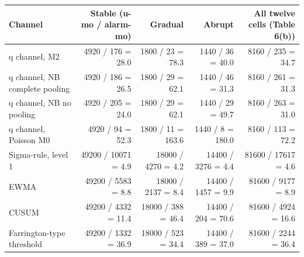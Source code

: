 \documentclass[10pt,a4paper]{article}
\begin{document}
\noindent\begin{minipage}{\linewidth}
\label{tab:S2-4}
\centering\scriptsize
\begin{tabular}{lrrrr}
\toprule
Channel & Stable (u-mo / alarm-mo) & Gradual & Abrupt & All twelve cells (Table 6(b)) \\ \midrule
q channel, M2 & 4920 / 176 = 28.0 & 1800 / 23 = 78.3 & 1440 / 36 = 40.0 & 8160 / 235 = 34.7 \\
q channel, NB complete pooling & 4920 / 186 = 26.5 & 1800 / 29 = 62.1 & 1440 / 46 = 31.3 & 8160 / 261 = 31.3 \\
q channel, NB no pooling & 4920 / 205 = 24.0 & 1800 / 29 = 62.1 & 1440 / 29 = 49.7 & 8160 / 263 = 31.0 \\
q channel, Poisson M0 & 4920 / 94 = 52.3 & 1800 / 11 = 163.6 & 1440 / 8 = 180.0 & 8160 / 113 = 72.2 \\
Sigma-rule, level 1 & 49200 / 10071 = 4.9 & 18000 / 4270 = 4.2 & 14400 / 3276 = 4.4 & 81600 / 17617 = 4.6 \\
EWMA & 49200 / 5583 = 8.8 & 18000 / 2137 = 8.4 & 14400 / 1457 = 9.9 & 81600 / 9177 = 8.9 \\
CUSUM & 49200 / 4332 = 11.4 & 18000 / 388 = 46.4 & 14400 / 204 = 70.6 & 81600 / 4924 = 16.6 \\
Farrington-type threshold & 49200 / 1332 = 36.9 & 18000 / 523 = 34.4 & 14400 / 389 = 37.0 & 81600 / 2244 = 36.4 \\
\bottomrule
\end{tabular}
\end{minipage}
\vspace{22pt}
\end{document}

